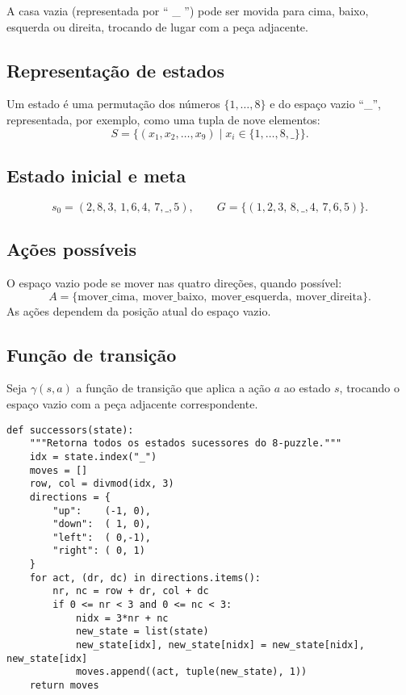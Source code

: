 \documentclass[9pt,a4paper]{extarticle}
\begin{document}
A casa vazia (representada por “ \_ ”) pode ser movida para cima, baixo, esquerda ou direita, trocando de lugar com a peça adjacente.

\subsection*{Representação de estados}

Um estado é uma permutação dos números $\{1,\dots,8\}$ e do espaço vazio “\_”, representada, por exemplo, como uma tupla de nove elementos:
\[
S = \{(x_1, x_2, \dots, x_9) \mid x_i \in \{1,\dots,8,\_\}\}.
\]

\subsection*{Estado inicial e meta}

\[
s_0 = (2,8,3,\,1,6,4,\,7,\_,5), \qquad
G = \{(1,2,3,\,8,\_,4,\,7,6,5)\}.
\]

\subsection*{Ações possíveis}

O espaço vazio pode se mover nas quatro direções, quando possível:
\[
A = \{\text{mover\_cima},\ \text{mover\_baixo},\ \text{mover\_esquerda},\ \text{mover\_direita}\}.
\]
As ações dependem da posição atual do espaço vazio.

\subsection*{Função de transição}

Seja $\gamma(s,a)$ a função de transição que aplica a ação $a$ ao estado $s$, trocando o espaço vazio com a peça adjacente correspondente.

\begin{lstlisting}
def successors(state):
    """Retorna todos os estados sucessores do 8-puzzle."""
    idx = state.index("_")
    moves = []
    row, col = divmod(idx, 3)
    directions = {
        "up":    (-1, 0),
        "down":  ( 1, 0),
        "left":  ( 0,-1),
        "right": ( 0, 1)
    }
    for act, (dr, dc) in directions.items():
        nr, nc = row + dr, col + dc
        if 0 <= nr < 3 and 0 <= nc < 3:
            nidx = 3*nr + nc
            new_state = list(state)
            new_state[idx], new_state[nidx] = new_state[nidx], new_state[idx]
            moves.append((act, tuple(new_state), 1))
    return moves
\end{lstlisting}
\end{document}
